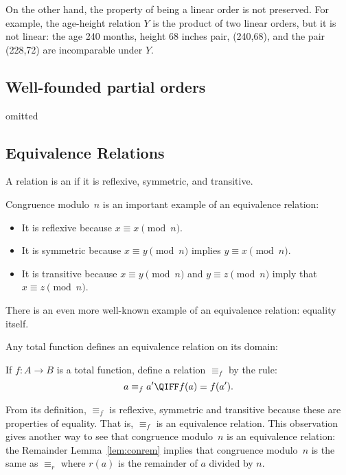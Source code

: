 On the other hand, the property of being a linear order is not preserved.
For example, the age-height relation $Y$ is the product of two linear
orders, but it is not linear: the age 240 months, height 68 inches pair,
(240,68), and the pair (228,72) are incomparable under $Y$.

\begin{problems}

\classproblems
{}

\end{problems}

\begin{editingnotes}
\chapter*{Well-founded partial orders}
omitted
\end{editingnotes}

\section{Equivalence Relations}\label{equiv_rel_sec}
\begin{definition}
A relation is an  if it is reflexive,
symmetric, and transitive.
\end{definition}

Congruence modulo~$n$ is an important example of an equivalence
relation:
\begin{itemize}

\item
It is reflexive because $x \equiv x \pmod{n}$.

\item
It is symmetric because $x \equiv y \pmod{n}$ implies $y \equiv x
\pmod{n}$.

\item
It is transitive because $x \equiv y \pmod{n}$ and $y \equiv z
\pmod{n}$ imply that $x \equiv z \pmod{n}$.

\end{itemize}
There is an even more well-known example of an equivalence relation:
equality itself.

Any total function defines an equivalence relation on its domain:
\begin{definition}\label{equiv_f}
If $f:A \to B$ is a total function, define a relation $\equiv_f$ by the rule:
\[
a \equiv_f a'  \QIFF f(a) = f(a').
\]
\end{definition}
From its definition, $\equiv_f$ is reflexive, symmetric and transitive
because these are properties of equality.  That is, $\equiv_f$ is an
equivalence relation.  This observation gives another way to see that
congruence modulo~$n$ is an equivalence relation: the Remainder
Lemma~\ref{lem:conrem} implies that congruence modulo~$n$ is the same
as $\equiv_r$ where $r(a)$ is the remainder of $a$ divided by $n$.

